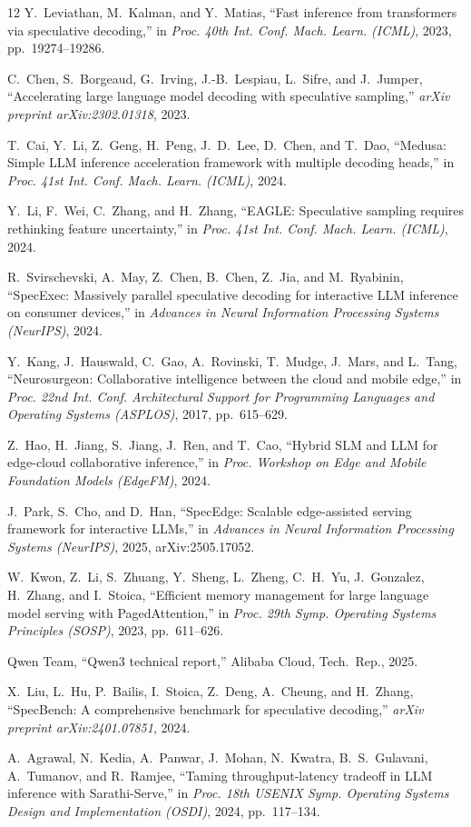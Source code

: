 \documentclass[10pt,conference]{IEEEtran}
\begin{document}
\begin{thebibliography}{12}
Y.~Leviathan, M.~Kalman, and Y.~Matias, ``Fast inference from transformers via speculative decoding,'' in \emph{Proc. 40th Int. Conf. Mach. Learn. (ICML)}, 2023, pp.~19274--19286.

C.~Chen, S.~Borgeaud, G.~Irving, J.-B.~Lespiau, L.~Sifre, and J.~Jumper, ``Accelerating large language model decoding with speculative sampling,'' \emph{arXiv preprint arXiv:2302.01318}, 2023.

T.~Cai, Y.~Li, Z.~Geng, H.~Peng, J.~D.~Lee, D.~Chen, and T.~Dao, ``Medusa: Simple LLM inference acceleration framework with multiple decoding heads,'' in \emph{Proc. 41st Int. Conf. Mach. Learn. (ICML)}, 2024.

Y.~Li, F.~Wei, C.~Zhang, and H.~Zhang, ``EAGLE: Speculative sampling requires rethinking feature uncertainty,'' in \emph{Proc. 41st Int. Conf. Mach. Learn. (ICML)}, 2024.

R.~Svirschevski, A.~May, Z.~Chen, B.~Chen, Z.~Jia, and M.~Ryabinin, ``SpecExec: Massively parallel speculative decoding for interactive LLM inference on consumer devices,'' in \emph{Advances in Neural Information Processing Systems (NeurIPS)}, 2024.

Y.~Kang, J.~Hauswald, C.~Gao, A.~Rovinski, T.~Mudge, J.~Mars, and L.~Tang, ``Neurosurgeon: Collaborative intelligence between the cloud and mobile edge,'' in \emph{Proc. 22nd Int. Conf. Architectural Support for Programming Languages and Operating Systems (ASPLOS)}, 2017, pp.~615--629.

Z.~Hao, H.~Jiang, S.~Jiang, J.~Ren, and T.~Cao, ``Hybrid SLM and LLM for edge-cloud collaborative inference,'' in \emph{Proc. Workshop on Edge and Mobile Foundation Models (EdgeFM)}, 2024.

J.~Park, S.~Cho, and D.~Han, ``SpecEdge: Scalable edge-assisted serving framework for interactive LLMs,'' in \emph{Advances in Neural Information Processing Systems (NeurIPS)}, 2025, arXiv:2505.17052.

W.~Kwon, Z.~Li, S.~Zhuang, Y.~Sheng, L.~Zheng, C.~H.~Yu, J.~Gonzalez, H.~Zhang, and I.~Stoica, ``Efficient memory management for large language model serving with PagedAttention,'' in \emph{Proc. 29th Symp. Operating Systems Principles (SOSP)}, 2023, pp.~611--626.

Qwen Team, ``Qwen3 technical report,'' Alibaba Cloud, Tech.\ Rep., 2025.

X.~Liu, L.~Hu, P.~Bailis, I.~Stoica, Z.~Deng, A.~Cheung, and H.~Zhang, ``SpecBench: A comprehensive benchmark for speculative decoding,'' \emph{arXiv preprint arXiv:2401.07851}, 2024.

A.~Agrawal, N.~Kedia, A.~Panwar, J.~Mohan, N.~Kwatra, B.~S.~Gulavani, A.~Tumanov, and R.~Ramjee, ``Taming throughput-latency tradeoff in LLM inference with Sarathi-Serve,'' in \emph{Proc. 18th USENIX Symp. Operating Systems Design and Implementation (OSDI)}, 2024, pp.~117--134.
\end{thebibliography}
\end{document}
